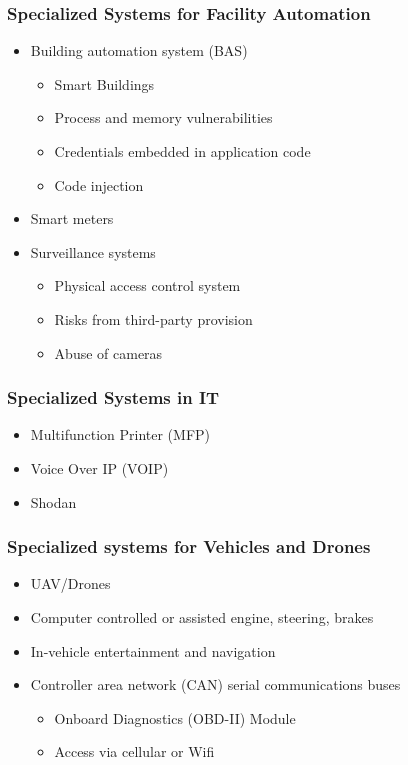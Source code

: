 		\subsubsection {Specialized Systems for Facility Automation}
			\begin{itemize}
				\item Building automation system (BAS)
					\begin{itemize}
						\item Smart Buildings
						\item Process and memory vulnerabilities
						\item Credentials embedded in application code
						\item Code injection 
					\end{itemize}
				\item Smart meters
				\item Surveillance systems
					\begin{itemize}
						\item Physical access control system
						\item Risks from third-party provision
						\item Abuse of cameras
					\end{itemize}
			\end{itemize}
		\subsubsection {Specialized Systems in IT}
			\begin{itemize}
				\item Multifunction Printer (MFP)
				\item Voice Over IP (VOIP)
				\item Shodan
			\end{itemize}
		\subsubsection {Specialized systems for Vehicles and Drones}
			\begin{itemize}
				\item UAV/Drones
				\item Computer controlled or assisted engine, steering, brakes
				\item In-vehicle entertainment and navigation
				\item Controller area network (CAN) serial communications buses
					\begin{itemize}
						\item Onboard Diagnostics (OBD-II) Module
						\item Access via cellular or Wifi
					\end{itemize}
			\end{itemize}
